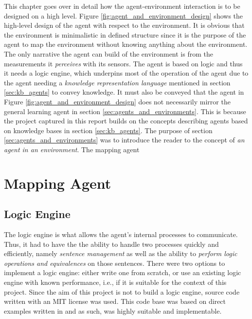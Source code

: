 This chapter goes over in detail how the agent-environment interaction is to be designed on a high level. Figure \ref{fig:agent_and_environment_design} shows the high-level design of the agent with respect to the environment.
It is obvious that the environment is minimalistic in defined structure since it is the purpose of the agent to map the environment without knowing anything about the environment. The only narrative the agent can build of the environment is from the measurements it \textit{perceives} with its sensors. The agent is based on logic and thus it needs a logic engine, which underpins most of the operation of the agent due to the agent needing a \textit{knowledge representation language} mentioned in section \ref{sec:kb_agents} to convey knowledge.
It must also be conveyed that the agent in Figure \ref{fig:agent_and_environment_design} does not necessarily mirror the general learning agent in section \ref{sec:agents_and_environments}. This is because the project captured in this report builds on the concepts describing agents based on knowledge bases in section \ref{sec:kb_agents}. The purpose of section \ref{sec:agents_and_environments} was to introduce the reader to the concept of \textit{an agent in an environment}. The mapping agent 





\section{Mapping Agent}		

\subsection{Logic Engine}
The logic engine is what allows the agent's internal processes to communicate. Thus, it had to have the the ability to handle two processes quickly and efficiently, namely \textit{sentence management} as well as the ability to \textit{perform logic operations and equivalences} on those sentences. There were two options to implement a logic engine: either write one from scratch, or use an existing logic engine with known performance, i.e., if it is suitable for the context of this project. Since the aim of this project is not to build a logic engine, source code written with an MIT license was used. This code base was based on direct examples written in \citep{russell2016artificial} and as such, was highly suitable and implementable.

